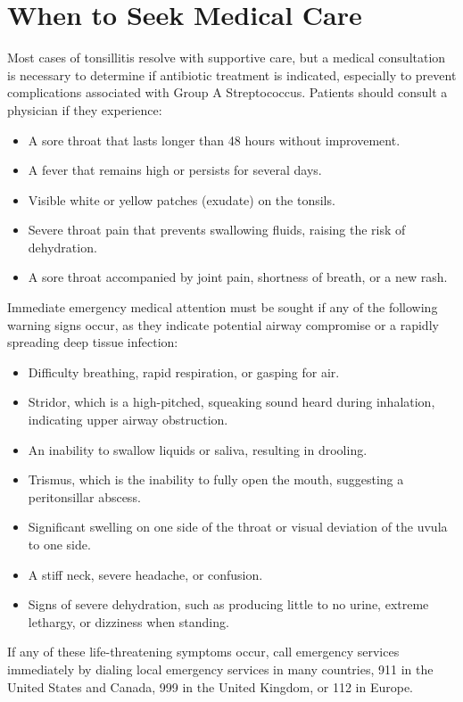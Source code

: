 \section*{When to Seek Medical Care}
Most cases of tonsillitis resolve with supportive care, but a medical consultation is necessary to determine if antibiotic treatment is indicated, especially to prevent complications associated with Group A Streptococcus.
Patients should consult a physician if they experience:
\begin{itemize}
    \item A sore throat that lasts longer than 48 hours without improvement.
    \item A fever that remains high or persists for several days.
    \item Visible white or yellow patches (exudate) on the tonsils.
    \item Severe throat pain that prevents swallowing fluids, raising the risk of dehydration.
    \item A sore throat accompanied by joint pain, shortness of breath, or a new rash.
\end{itemize}

Immediate emergency medical attention must be sought if any of the following warning signs occur, as they indicate potential airway compromise or a rapidly spreading deep tissue infection:
\begin{itemize}
    \item Difficulty breathing, rapid respiration, or gasping for air.
    \item Stridor, which is a high-pitched, squeaking sound heard during inhalation, indicating upper airway obstruction.
    \item An inability to swallow liquids or saliva, resulting in drooling.
    \item Trismus, which is the inability to fully open the mouth, suggesting a peritonsillar abscess.
    \item Significant swelling on one side of the throat or visual deviation of the uvula to one side.
    \item A stiff neck, severe headache, or confusion.
    \item Signs of severe dehydration, such as producing little to no urine, extreme lethargy, or dizziness when standing.
\end{itemize}
If any of these life-threatening symptoms occur, call emergency services immediately by dialing local emergency services in many countries, 911 in the United States and Canada, 999 in the United Kingdom, or 112 in Europe.


